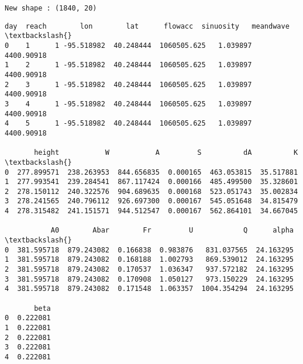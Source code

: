 \documentclass[11pt]{article}
\makeatletter
\newcommand{\boxspacing}{\kern\kvtcb@left@rule\kern\kvtcb@boxsep}
\newcommand{\prompt}[4]{
        {\ttfamily\llap{{\color{#2}[#3]:\hspace{3pt}#4}}\vspace{-\baselineskip}}
    }
\makeatother
\begin{document}
    \begin{Verbatim}[commandchars=\\\{\}]
New shape : (1840, 20)
    \end{Verbatim}

            \begin{tcolorbox}[breakable, size=fbox, boxrule=.5pt, pad at break*=1mm, opacityfill=0]
\prompt{Out}{outcolor}{59}{\boxspacing}
\begin{Verbatim}[commandchars=\\\{\}]
   day  reach        lon        lat      flowacc  sinuosity   meandwave  \textbackslash{}
0    1      1 -95.518982  40.248444  1060505.625   1.039897  4400.90918
1    2      1 -95.518982  40.248444  1060505.625   1.039897  4400.90918
2    3      1 -95.518982  40.248444  1060505.625   1.039897  4400.90918
3    4      1 -95.518982  40.248444  1060505.625   1.039897  4400.90918
4    5      1 -95.518982  40.248444  1060505.625   1.039897  4400.90918

       height           W           A         S          dA          K  \textbackslash{}
0  277.899571  238.263953  844.656835  0.000165  463.053815  35.517881
1  277.993541  239.284541  867.117424  0.000166  485.499500  35.328601
2  278.150112  240.322576  904.689635  0.000168  523.051743  35.002834
3  278.241565  240.796112  926.697300  0.000167  545.051648  34.815479
4  278.315482  241.151571  944.512547  0.000167  562.864101  34.667045

           A0        Abar        Fr         U            Q      alpha  \textbackslash{}
0  381.595718  879.243082  0.166838  0.983876   831.037565  24.163295
1  381.595718  879.243082  0.168188  1.002793   869.539012  24.163295
2  381.595718  879.243082  0.170537  1.036347   937.572182  24.163295
3  381.595718  879.243082  0.170908  1.050127   973.150229  24.163295
4  381.595718  879.243082  0.171548  1.063357  1004.354294  24.163295

       beta
0  0.222081
1  0.222081
2  0.222081
3  0.222081
4  0.222081
\end{Verbatim}
\end{tcolorbox}
        
\end{document}

